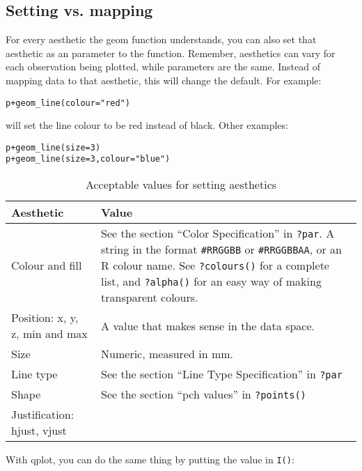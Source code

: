\subsection{Setting vs. mapping}
\label{sub:setting-mapping}

For every aesthetic the geom function understands, you can also set that aesthetic as an parameter to the function.  Remember, aesthetics can vary for each observation being plotted, while parameters are the same.  Instead of mapping data to that aesthetic, this will change the default.  For example:

\begin{alltt}
p + geom_line(colour="red")  
\end{alltt}

\noindent will set the line colour to be red instead of black.  Other examples:

\begin{alltt}
p + geom_line(size=3)  
p + geom_line(size=3, colour="blue")  
\end{alltt}

\begin{table}
  \begin{center}
  \begin{tabular}{lp{3in}}
    \toprule
    Aesthetic & Value \\
    \midrule
    Colour and fill & See the section ``Color Specification'' in {\tt ?par}.  A string in the format {\tt \#RRGGBB} or {\tt \#RRGGBBAA}, or an R colour name.  See {\tt ?colours()} for a complete list, and {\tt ?alpha()} for an easy way of making transparent colours. \\
    Position: x, y, z, min and max & A value that makes sense in the data space. \\ 
    Size & Numeric, measured in mm.\\
    Line type &  See the section ``Line Type Specification'' in {\tt ?par}\\
    Shape & See the section ``pch values'' in {\tt ?points()} \\
    Justification: hjust, vjust &  \\
    \bottomrule
  \end{tabular}
  \end{center}
  \caption{Acceptable values for setting aesthetics}
  \label{tbl:aesthetic-values}
\end{table}

With qplot, you can do the same thing by putting the value in {\tt I()}:

